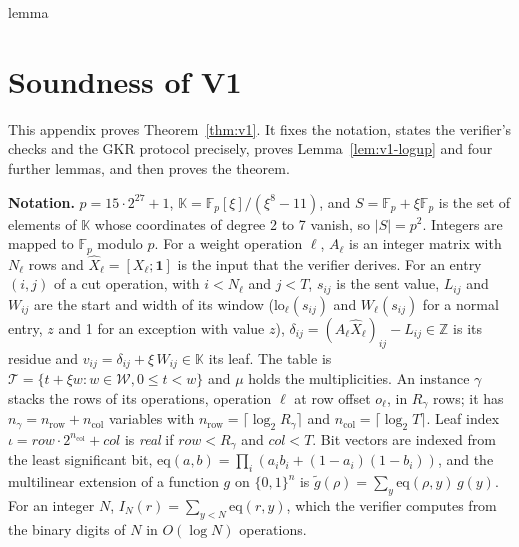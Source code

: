 \providecommand{\Kpre}{\mathsf{K}_{\mathrm{pre}}}
\providecommand{\sC}{\mathsf{C}}
\providecommand{\T}{\top}
\providecommand{\F}{\mathbb{F}_p}
\providecommand{\enc}{\mathrm{Enc}}
\providecommand{\para}[1]{\par\noindent\textbf{#1}\quad}
\providecommand{\qed}{\hfill$\square$}
\providecommand{\Fext}{\mathbb{K}}
\providecommand{\Vlo}{\mathrm{lo}}
\providecommand{\Vshift}{\mathrm{shift}}
\providecommand{\Vrq}{\mathrm{rq}}
\providecommand{\Vtab}{\mathcal{T}}
\providecommand{\Vcut}{\mathcal{C}}
\providecommand{\Vclr}{\mathcal{O}}
\providecommand{\Nleaf}{N_{\mathrm{leaf}}}
\providecommand{\Veq}{\mathrm{eq}}
\ifcsname lemma\endcsname\else\newtheorem{lemma}{Lemma}\fi

\section{Soundness of V1}
\label{app:v1}

This appendix proves Theorem~\ref{thm:v1}. It fixes the notation, states the verifier's checks
and the GKR protocol precisely, proves Lemma~\ref{lem:v1-logup} and four further lemmas, and then
proves the theorem.

\para{Notation.} $p = 15 \cdot 2^{27} + 1$, $\Fext = \F[\xi]/(\xi^8 - 11)$, and $S = \F + \xi\F$ is
the set of elements of $\Fext$ whose coordinates of degree 2 to 7 vanish, so $|S| = p^2$. Integers
are mapped to $\F$ modulo $p$. For a weight operation $\ell$, $A_\ell$ is an integer matrix with
$N_\ell$ rows and $\hat X_\ell = [X_\ell; \mathbf 1]$ is the input that the verifier derives. For
an entry $(i,j)$ of a cut operation, with $i < N_\ell$ and $j < T$, $s_{ij}$ is the sent value,
$L_{ij}$ and $W_{ij}$ are the start and width of its window ($\Vlo_\ell(s_{ij})$ and
$W_\ell(s_{ij})$ for a normal entry, $z$ and 1 for an exception with value $z$), $\delta_{ij} =
(A_\ell \hat X_\ell)_{ij} - L_{ij} \in \mathbb Z$ is its residue and $v_{ij} = \delta_{ij} +
\xi\,W_{ij} \in \Fext$ its leaf. The table is $\Vtab = \{t + \xi w : w \in \mathcal W, 0 \le t < w\}$
and $\mu$ holds the multiplicities. An instance $\gamma$ stacks the rows of its operations,
operation $\ell$ at row offset $o_\ell$, in $R_\gamma$ rows; it has $n_\gamma = n_{\mathrm{row}} +
n_{\mathrm{col}}$ variables with $n_{\mathrm{row}} = \lceil \log_2 R_\gamma \rceil$ and
$n_{\mathrm{col}} = \lceil \log_2 T \rceil$. Leaf index $\iota = \mathit{row} \cdot
2^{n_{\mathrm{col}}} + \mathit{col}$ is \emph{real} if $\mathit{row} < R_\gamma$ and $\mathit{col}
< T$. Bit vectors are indexed from the least significant bit, $\Veq(a, b) = \prod_i (a_i b_i +
(1 - a_i)(1 - b_i))$, and the multilinear extension of a function $g$ on $\{0,1\}^n$ is
$\tilde g(\rho) = \sum_{y} \Veq(\rho, y)\, g(y)$. For an integer $N$, $I_N(r) = \sum_{y < N}
\Veq(r, y)$, which the verifier computes from the binary digits of $N$ in $O(\log N)$ operations.

